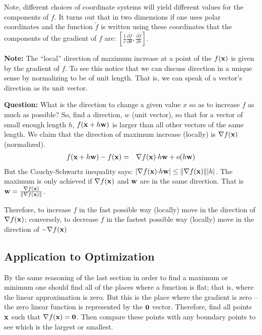 \documentclass{article}
\begin{document}
Note, different choices of
coordinate systems will yield different
values for the components of $f$. It turns out that in two dimensions if one uses
polar coordinates and the function ${\tilde f}$ is written using these coordinates
that the components of the gradient of $f$ are:
$[\frac{1}{r} \frac{\partial {\tilde f}}{\partial \theta}, \frac{\partial {\tilde f}}{\partial r}]$.

{\bf Note:\/} The ``local''{} direction of maximum increase at a point of the
$f({\bf x})$ is given by the gradient of $f$. To see this notice that we can
discuss direction in a unique sense by normalizing to be of unit length.
That is, we can speak of a vector's direction as its unit vector.

{\bf Question:\/} What is the direction to change a given value $x$ so as
to increase $f$ as much as possible? So, find a direction, $w$ (unit vector),
so that for a vector of small enough length $h$, $f({\bf x} + h{\bf w})$ is larger than
all other vectors of the same length. We claim that the direction of
maximum increase (locally) is $\nabla f({\bf x})$ (normalized).
\begin{eqnarray}
  f({\bf x} + h {\bf w})  - f({\bf x}) & = & \nabla f({\bf x}) {\bf \cdot} h {\bf w} + o(h {\bf w})
\end{eqnarray}
But the Cauchy-Schwartz inequality says:
$|\nabla f({\bf x}) {\bf \cdot} h{\bf w}| \le \|\nabla f({\bf x})\| |h|$.
The maximum is only achieved if $\nabla f({\bf x})$ and ${\bf w}$ are in the
same direction. That is ${\bf w} = \frac{\nabla f({\bf x})}{\|\nabla f({\bf x})\|}$.

Therefore, to increase $f$ in the fast possible way (locally) move in the direction
of $\nabla f({\bf x})$; conversely, to decrease $f$ in the
fastest possible way (locally) move in the direction of $-\nabla f({\bf x})$

\subsection{Application to Optimization}
By the same reasoning of the last section in order to find a maximum or minimum
one should find all of the places where a function is flat; that is, where the linear
approximation is zero. But this is the place where the gradient is zero -- the
zero linear function is represented by the ${\bf 0}$ vector. Therefore, find
all points ${\bf x}$ such that $\nabla f({\bf x}) = {\bf 0}$. Then compare
these points with any boundary points to see which is the largest or smallest.
\end{document}
